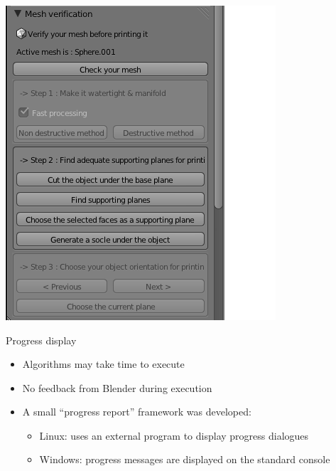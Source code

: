 \documentclass{beamer}
\begin{document}
\begin{frame}
	\frametitle{}
    \begin{center}
		\includegraphics[height=.9\textheight]{Panel}
	\end{center}
\end{frame}

\begin{frame}
    \begin{block}{Progress display}
	\begin{itemize}
	\item Algorithms may take time to execute
	\item No feedback from Blender during execution
	\item A small “progress report” framework was developed:
	\begin{itemize}
		\item Linux: uses an external program to display progress dialogues
		\item Windows: progress messages are displayed on the standard console
	\end{itemize}
	\end{itemize}
    \end{block}
\end{frame}
\end{document}
